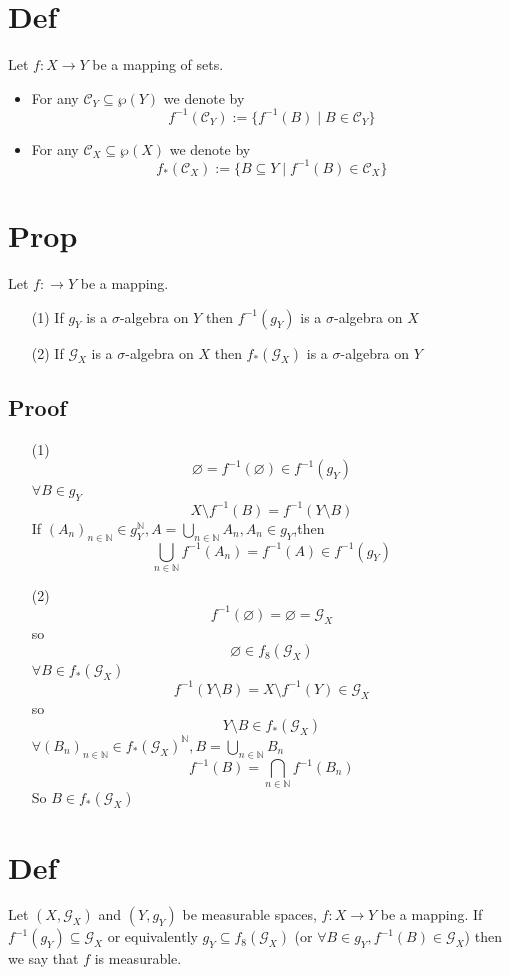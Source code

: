 \documentclass{book}
\begin{document}
\section{Def}
Let $f:X\rightarrow Y$ be a mapping of sets.\begin{itemize}
    \item For any $\mathcal{C}_Y\subseteq\wp(Y)$ we denote by $$f^{-1}(\mathcal{C}_Y):=\{f^{-1}(B)\mid B\in \mathcal{C}_Y\}$$
    \item For any $\mathcal{C}_X\subseteq\wp(X)$ we denote by $$f_*(\mathcal{C}_X):=\{B\subseteq Y\mid f^{-1}(B)\in \mathcal{C}_X\}$$
\end{itemize}
\section{Prop}
Let $f:\rightarrow Y$ be a mapping.
\begin{itemize}
    \item[(1)] If $g_Y$ is a $\sigma$-algebra on $Y$ then $f^{-1}(g_Y)$ is a $\sigma$-algebra on $X$
    \item[(2)] If $\mathcal{G}_X$ is a $\sigma$-algebra on $X$ then $f_*(\mathcal{G}_X)$ is a $\sigma$-algebra on $Y$
\end{itemize}
\subsection*{Proof}
\begin{itemize}
    \item [(1)]$$\varnothing=f^{-1}(\varnothing)\in f^{-1}(g_Y)$$
    $\forall B\in g_Y$$$X\setminus f^{-1}(B)= f^{-1}(Y\setminus B)$$
    If $(A_n)_{n\in \mathbb{N}}\in g_Y^\mathbb{N},A=\bigcup\limits_{n\in \mathbb{N}}A_n,A_n\in g_Y$,then $$\bigcup\limits_{n\in \mathbb{N}}f^{-1}(A_n)=f^{-1}(A)\in f^{-1}(g_Y)$$
    \item [(2)]$$f^{-1}(\varnothing)=\varnothing=\mathcal{G}_X$$
    so $$\varnothing\in f_8(\mathcal{G}_X)$$
    $\forall B\in f_*(\mathcal{G}_X)$ $$f^{-1}(Y\setminus B)=X\setminus f^{-1}(Y)\in \mathcal{G}_X$$ so $$Y\setminus B\in f_*(\mathcal{G}_X)$$
    $\forall(B_n)_{n\in \mathbb{N}}\in f_*(\mathcal{G}_X)^\mathbb{N},B=\bigcup\limits_{n\in \mathbb{N}}B_n$$$f^{-1}(B)=\bigcap\limits_{n\in \mathbb{N}}f^{-1}(B_n)$$So $B\in f_*(\mathcal{G}_X)$
\end{itemize}
\section{Def}
Let $(X,\mathcal{G}_X)$ and $(Y,g_Y)$ be measurable spaces, $f:X\rightarrow Y$ be a mapping. If $f^{-1}(g_Y)\subseteq \mathcal{G}_X$ or equivalently $g_Y\subseteq f_8(\mathcal{G}_X)$ (or $\forall B\in g_Y,f^{-1}(B)\in \mathcal{G}_X$) then we say that $f$ is measurable.
\end{document}
